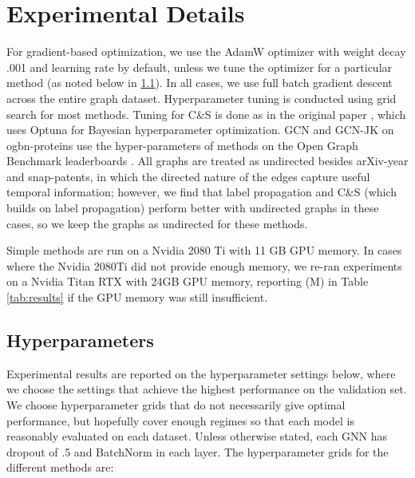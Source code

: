 \documentclass[sigconf, balance=false]{acmart}
\begin{document}
\section{Experimental Details}\label{sec:exp_details}

For gradient-based optimization, we use the AdamW optimizer \cite{kingma2014adam, loshchilov2018decoupled} with weight decay .001  and learning rate  by default, unless we tune the optimizer for a particular method (as noted below in \ref{sec:hparams}). In all cases, we use full batch gradient descent across the entire graph dataset. Hyperparameter tuning is conducted using grid search for most methods. Tuning for C\&S is done as in the original paper \cite{huang2021combining}, which uses Optuna \cite{optuna} for Bayesian hyperparameter optimization. GCN and GCN-JK on ogbn-proteins use the hyper-parameters of methods on the Open Graph Benchmark leaderboards \cite{hu2020open}. All graphs are treated as undirected besides arXiv-year and snap-patents, in which the directed nature of the edges capture useful temporal information; however, we find that label propagation and C\&S (which builds on label propagation) perform better with undirected graphs in these cases, so we keep the graphs as undirected for these methods. 

Simple methods are run on a Nvidia 2080 Ti with 11 GB GPU memory. In cases where the Nvidia 2080Ti did not provide enough memory, we re-ran experiments on a Nvidia Titan RTX with 24GB GPU memory, reporting (M) in Table \ref{tab:results} if the GPU memory was still insufficient. 
 
\subsection{Hyperparameters}\label{sec:hparams}

Experimental results are reported on the hyperparameter settings below, where we choose the settings that achieve the highest performance on the validation set.
We choose hyperparameter grids that do not necessarily give optimal performance, but hopefully cover enough regimes so that each model is reasonably evaluated on each dataset. Unless otherwise stated, each GNN has dropout of .5 \cite{srivastava2014dropout} and BatchNorm \cite{ioffe2015batch} in each layer. The hyperparameter grids for the different methods are:
\end{document}
